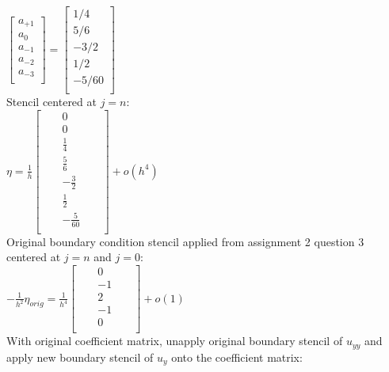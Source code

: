 \documentclass[12pt,letter]{article}
\begin{document}
\begin{enumerate}
\begin{enumerate}
    $
    \begin{bmatrix}
      a_{+1}\\
      a_{0}\\
      a_{-1}\\
      a_{-2}\\
      a_{-3}\\
    \end{bmatrix}=
    \begin{bmatrix}
      1/4\\
      5/6\\
      -3/2\\
      1/2\\
      -5/60\\
    \end{bmatrix}
    $\\
    
    Stencil centered at $j=n$:\\
    $\eta=
    \frac{1}{h}
    \begin{bmatrix}
      & & 0 & & \\
      & & 0 & & \\
      & & \frac{1}{4} & & \\
      & & \frac{5}{6} & &\\
      & & -\frac{3}{2} & &\\
      & & \frac{1}{2} & &\\
      & & -\frac{5}{60} & & \\
    \end{bmatrix}
    +o(h^4)$\\
    
    Original boundary condition stencil applied from assignment 2 question 3 centered at $j=n$ and $j=0$:\\
    
    $ -\frac{1}{h^2}\eta_{orig} = \frac{1}{h^4}
    \begin{bmatrix}
      & &  0  & & \\
      & & -1  & & \\
      & &  2  & & \\
      & &  -1  & & \\
      & &  0  & & \\
    \end{bmatrix}+o(1)$\\
    
    With original coefficient matrix, unapply original boundary stencil of $u_{yy}$ and apply new boundary stencil of $u_y$ onto the coefficient matrix:\\


\end{enumerate}
\end{enumerate}
\end{document}
